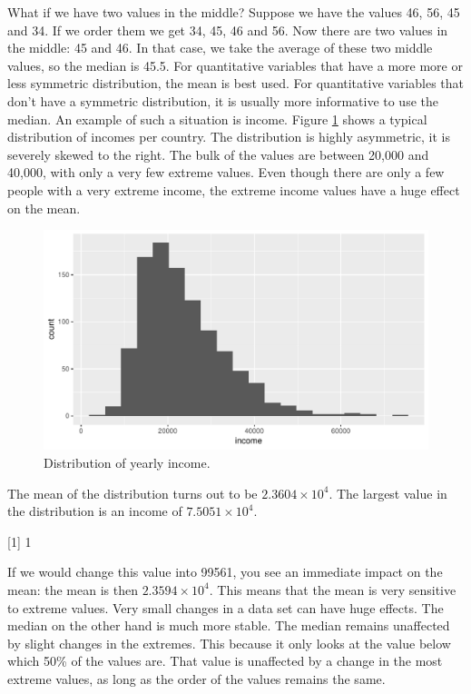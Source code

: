 \documentclass[]{report}\usepackage[]{graphicx}\usepackage[]{color}
\makeatletter
\def\maxwidth{ %
  \ifdim\Gin@nat@width>\linewidth
    \linewidth
  \else
    \Gin@nat@width
  \fi
}
\makeatother
\begin{document}
What if we have two values in the middle? Suppose we have the values 46, 56, 45 and 34. If we order them we get 34, 45, 46 and 56. Now there are two values in the middle: 45 and 46. In that case, we take the average of these two middle values, so the median is 45.5. For quantitative variables that have a more more or less symmetric distribution, the mean is best used. For quantitative variables that don't have a symmetric distribution, it is usually more informative to use the median. An example of such a situation is income. Figure \ref{fig:median} shows a typical distribution of incomes per country. The distribution is highly asymmetric, it is severely skewed to the right. The bulk of the values are between 20,000 and 40,000, with only a very few extreme values. Even though there are only a few people with a very extreme income, the extreme income values have a huge effect on the mean. 

\begin{figure}

{\centering \includegraphics[width=\maxwidth]{figure/median-1} 

}

\caption[Distribution of yearly income]{Distribution of yearly income.}\label{fig:median}
\end{figure}



The mean of the distribution turns out to be \ensuremath{2.3604\times 10^{4}}. The largest value in the distribution is an income of \ensuremath{7.5051\times 10^{4}}. 

[1] 1


If we would change this value into 99561, you see an immediate impact on the mean: the mean is then \ensuremath{2.3594\times 10^{4}}. This means that the mean is very sensitive to extreme values. Very small changes in a data set can have huge effects. The median on the other hand is much more stable. The median remains unaffected by slight changes in the extremes. This because it only looks at the value below which 50\% of the values are. That value is unaffected by a change in the most extreme values, as long as the order of the values remains the same. 
\end{document}
